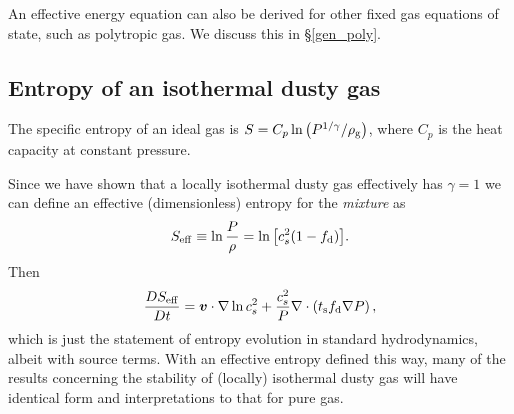

An effective energy equation can also be derived for other 
fixed gas equations of state, such as polytropic gas. We discuss this
in \S\ref{gen_poly}.

\subsection{Entropy of an isothermal dusty gas }

The specific entropy of an ideal gas is 
$S = C_p\ln{\left(P^{1/\gamma}/\rho_\mathrm{g}\right)}$, where $C_p$ is the heat 
capacity at constant pressure. 

Since we have shown that a locally isothermal dusty gas effectively has $\gamma=1$ we can define an effective (dimensionless)   
entropy for the \emph{mixture} as 
\begin{align}
   S_\mathrm{eff} \equiv \ln \frac{P}{\rho} = \ln{\left[c_s^2(1-f_\mathrm{d})\right]}.  
\end{align} 
Then 
\begin{align*}
  \frac{D S_\mathrm{eff}}{D t} = \bm{v}\cdot\nabla\ln{c_s^2} +
  \frac{c_s^2}{P}\nabla\cdot\left(t_\mathrm{s}f_\mathrm{d}\nabla P\right), 
\end{align*}
which is just the statement of entropy evolution in standard  
hydrodynamics, albeit with source terms. With an effective
entropy defined this way, many of the  
results concerning the stability of (locally) isothermal dusty gas
will have identical form and interpretations to that for pure gas.   


